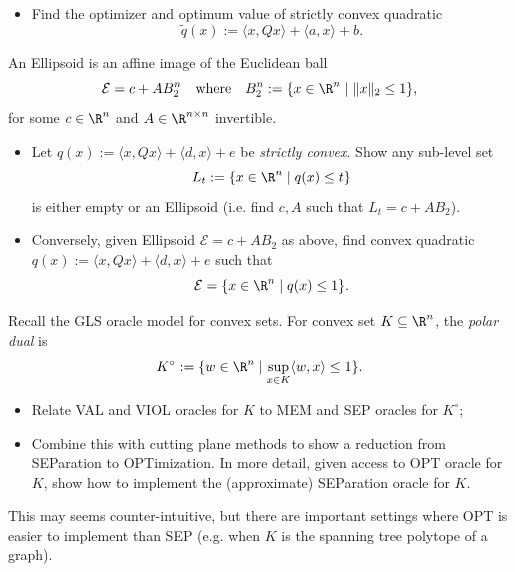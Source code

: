 \documentclass[addpoints,12pt,A4]{exam}
\begin{document}
\begin{questions}
\begin{itemize}
    \item Find the optimizer and optimum value of strictly convex quadratic
    \[ \tilde{q}(x) := \langle x, Q x \rangle + \langle a, x \rangle + b .  \]
\end{itemize}

\begin{solution}

\end{solution}


\question
An Ellipsoid is an affine image of the Euclidean ball
    \[ \mathcal{E} = c + A B_{2}^{n} \quad \text{where} \quad B_{2}^{n} := \{ x \in \R^{n} \mid \|x\|_{2} \leq 1\}  , \]
    for some $c \in \R^{n}$ and $A \in \R^{n \times n}$ invertible.
    \begin{itemize}
    \item Let $q(x) := \langle x, Q x \rangle + \langle d, x \rangle + e$ be \emph{strictly convex}. Show any sub-level set
    \[ L_{t} := \{ x \in \R^{n} \mid q(x) \leq t \}  \]
    is either empty or an Ellipsoid (i.e. find $c,A$ such that $L_{t} = c + A B_{2}$). 

    \item Conversely, given Ellipsoid $\mathcal{E} = c + A B_{2}$ as above, find convex quadratic $q(x) := \langle x, Q x \rangle + \langle d, x \rangle + e$ such that 
    \[ \mathcal{E} = \{ x \in \R^{n} \mid q(x) \leq 1 \} .   \]
    
\end{itemize}
\begin{solution}

\end{solution}


\question
Recall the GLS oracle model for convex sets. For convex set $K \subseteq \R^{n}$, the \emph{polar dual} is 
\[ K^{\circ} := \{w \in \R^{n} \mid \sup_{x \in K} \langle w, x \rangle \leq 1 \} .   \]
\begin{itemize}
    \item Relate VAL and VIOL oracles for $K$ to MEM and SEP oracles for $K^{\circ}$;
    \item Combine this with cutting plane methods to show a reduction from SEParation to OPTimization. In more detail, given access to OPT oracle for $K$, show how to implement the (approximate) SEParation oracle for $K$. 
\end{itemize}
This may seems counter-intuitive, but there are important settings where OPT is easier to implement than SEP (e.g. when $K$ is the spanning tree polytope of a graph). 

\begin{solution}

\end{solution}








\end{questions}
\end{document}
